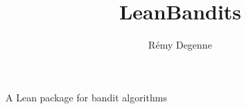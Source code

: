 \documentclass{report}
\title{LeanBandits}
\author{Rémy Degenne}
\begin{document}
\maketitle

\begin{center}
  \Large{A Lean package for bandit algorithms}
\end{center}


\end{document}

